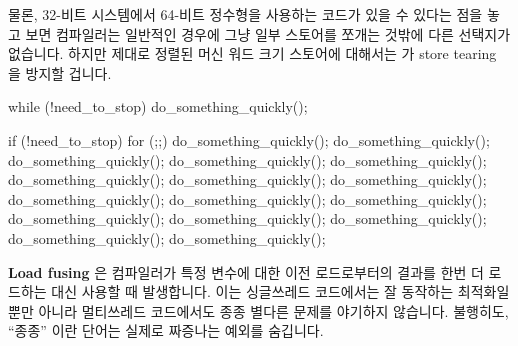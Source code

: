 물론, 32-비트 시스템에서 64-비트 정수형을 사용하는 코드가 있을 수 있다는 점을
놓고 보면 컴파일러는 일반적인 경우에 그냥 일부 스토어를 쪼개는 것밖에 다른
선택지가 없습니다.
하지만 제대로 정렬된 머신 워드 크기 스토어에 대해서는  가
store tearing 을 방지할 겁니다.

\begin{listing}[tbp]
\begin{fcvlabel}
\begin{VerbatimL}[commandchars=\\\{\}]
while (!need_to_stop)
	do_something_quickly();
\end{VerbatimL}
\end{fcvlabel}
\caption{Inviting Load Fusing}
\label{lst:toolsoftrade:Inviting Load Fusing}
\end{listing}

\begin{listing}[tbp]
\begin{fcvlabel}
\begin{VerbatimL}[commandchars=\\\[\]]
if (!need_to_stop)
	for (;;) {\lnlbl[loop:b]
		do_something_quickly();
		do_something_quickly();
		do_something_quickly();
		do_something_quickly();
		do_something_quickly();
		do_something_quickly();
		do_something_quickly();
		do_something_quickly();
		do_something_quickly();
		do_something_quickly();
		do_something_quickly();
		do_something_quickly();
		do_something_quickly();
		do_something_quickly();
		do_something_quickly();
		do_something_quickly();
	}\lnlbl[loop:e]
\end{VerbatimL}
\end{fcvlabel}
\caption{C Compilers Can Fuse Loads}
\label{lst:toolsoftrade:C Compilers Can Fuse Loads}
\end{listing}

{\bf Load fusing} 은 컴파일러가 특정 변수에 대한 이전 로드로부터의 결과를 한번
더 로드하는 대신 사용할 때 발생합니다.
이는 싱글쓰레드 코드에서는 잘 동작하는 최적화일 뿐만 아니라 멀티쓰레드
코드에서도 종종 별다른 문제를 야기하지 않습니다.
불행히도, ``종종'' 이란 단어는 실제로 짜증나는 예외를 숨깁니다.

